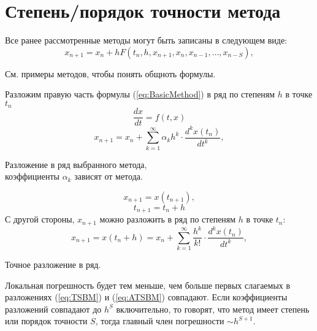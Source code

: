 \documentclass[a4paper,11pt]{article}
\begin{document}
\section{Степень/порядок точности метода\protect\footnotemark}
Все ранее рассмотренные методы могут быть записаны в следующем виде:
\begin{equation}
  \boxed{x_{n+1} = x_n + hF(t_n, h, x_{n+1}, x_n, x_{n-1}, \dots, x_{n-S}),}
  \label{eq:BasicMethod}
\end{equation}
\begin{center}
  \small{См. примеры методов, чтобы понять общноть формулы.}
\end{center}
Разложим правую часть формулы (\ref{eq:BasicMethod}) в ряд по степеням $h$ в точке $t_n$
\marginpar
{
  \vspace{3mm}
  \[\frac{dx}{dt}=f(t,x)\]
}
\begin{equation}
  \boxed{x_{n+1} = x_n + \sum_{k=1}^{\infty} \alpha_kh^k \cdot \frac{d^kx(t_n)}{dt^k},}
  \label{eq:TSBM}
\end{equation}
\begin{center}
  \small{Разложение в ряд выбранного метода, \\ коэффициенты $\alpha_k$ зависят от метода.}
\end{center}
\marginpar
{
  \vspace{4mm}
  \[x_{n+1} = x(t_{n+1}),\]
  \[t_{n+1}=t_n+h\]
}
С другой стороны, $x_{n+1}$ можно разложить в ряд по степеням $h$ в точке $t_n$:
\begin{equation}
  \boxed{x_{n+1} = x(t_n + h) = x_n + \sum_{k=1}^{\infty} \frac{h^k}{k!} \cdot \frac{d^kx(t_n)}{dt^k},}
  \label{eq:ATSBM}
\end{equation}
\begin{center}
  \small{Точное разложение в ряд.}
\end{center}
Локальная погрешность будет тем меньше, чем больше первых слагаемых в разложениях (\ref{eq:TSBM}) и (\ref{eq:ATSBM}) совпадают.
Если коэффициенты разложений совпадают до $h^S$ включительно, то говорят, что метод имеет степень или порядок точности $S$, тогда главный член погрешности $\sim h^{S+1}$. \\
\end{document}
